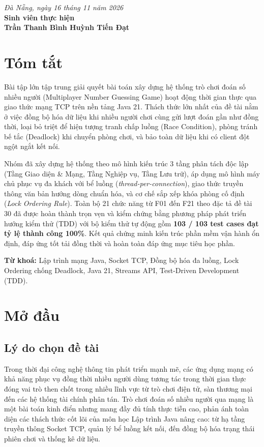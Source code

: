 \documentclass[12pt,a4paper,oneside]{report}
\begin{document}
\begin{flushright}
  \textit{Đà Nẵng, ngày 16 tháng 11 năm 2026}\\[5mm]
  \textbf{Sinh viên thực hiện}\\[15mm]
  \textbf{Trần Thanh Bình \qquad Huỳnh Tiến Đạt}
\end{flushright}

\chapter*{Tóm tắt}
Bài tập lớn tập trung giải quyết bài toán xây dựng hệ thống trò chơi đoán số nhiều người (Multiplayer Number Guessing Game) hoạt động thời gian thực qua giao thức mạng TCP trên nền tảng Java 21. Thách thức lớn nhất của đề tài nằm ở việc đồng bộ hóa dữ liệu khi nhiều người chơi cùng gửi lượt đoán gần như đồng thời, loại bỏ triệt để hiện tượng tranh chấp luồng (Race Condition), phòng tránh bế tắc (Deadlock) khi chuyển phòng chơi, và bảo toàn dữ liệu khi có client đột ngột ngắt kết nối.

Nhóm đã xây dựng hệ thống theo mô hình kiến trúc 3 tầng phân tách độc lập (Tầng Giao diện \& Mạng, Tầng Nghiệp vụ, Tầng Lưu trữ), áp dụng mô hình máy chủ phục vụ đa khách với bể luồng (\textit{thread-per-connection}), giao thức truyền thông văn bản hướng dòng chuẩn hóa, và cơ chế sắp xếp khóa phòng cố định (\textit{Lock Ordering Rule}). Toàn bộ 21 chức năng từ F01 đến F21 theo đặc tả đề tài 30 đã được hoàn thành trọn vẹn và kiểm chứng bằng phương pháp phát triển hướng kiểm thử (TDD) với bộ kiểm thử tự động gồm \textbf{103 / 103 test cases đạt tỷ lệ thành công 100\%}. Kết quả chứng minh kiến trúc phần mềm vận hành ổn định, đáp ứng tốt tải đồng thời và hoàn toàn đáp ứng mục tiêu học phần.

\textbf{Từ khoá:} Lập trình mạng Java, Socket TCP, Đồng bộ hóa đa luồng, Lock Ordering chống Deadlock, Java 21, Streams API, Test-Driven Development (TDD).

\tableofcontents
\listoffigures
\listoftables

\clearpage
{}

\chapter{Mở đầu}

\section{Lý do chọn đề tài}
Trong thời đại công nghệ thông tin phát triển mạnh mẽ, các ứng dụng mạng có khả năng phục vụ đồng thời nhiều người dùng tương tác trong thời gian thực đóng vai trò then chốt trong nhiều lĩnh vực từ trò chơi điện tử, sàn thương mại đến các hệ thống tài chính phân tán. Trò chơi đoán số nhiều người qua mạng là một bài toán kinh điển nhưng mang đầy đủ tính thực tiễn cao, phản ánh toàn diện các thách thức cốt lõi của môn học Lập trình Java nâng cao: từ hạ tầng truyền thông Socket TCP, quản lý bể luồng kết nối, đến đồng bộ hóa trạng thái phiên chơi và thống kê dữ liệu.
\end{document}
